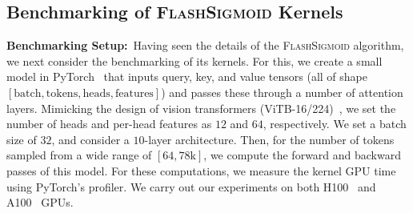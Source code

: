 \subsection{Benchmarking of \textsc{FlashSigmoid} Kernels}
\label{sec:PerformanceAnalysisOfFlashSigmoidKernels}
\noindent\textbf{Benchmarking Setup:}\ Having seen the details of the \textsc{FlashSigmoid} algorithm, we next consider the benchmarking of its kernels.
For this, we create a small model in PyTorch~\citep{DBLP:conf/nips/PaszkeGMLBCKLGA19} that inputs query, key, and value tensors (all of shape $[\textrm{batch}, \textrm{tokens}, \textrm{heads}, \textrm{features}]$) and passes these through a number of attention layers. 
Mimicking the design of vision transformers (ViTB-16/224)~\citep{DBLP:conf/iclr/DosovitskiyB0WZ21}, we set the number of heads and per-head features as $12$ and $64$, respectively.
We set a batch size of $32$, and consider a $10$-layer architecture.
Then, for the number of tokens sampled from a wide range of $[64, 78\mathrm{k}]$, we compute the forward and backward passes of this model.
For these computations, we measure the kernel GPU time using PyTorch's profiler. 
We carry out our experiments on both H100~\citep{DBLP:journals/micro/Choquette23} and A100~\citep{DBLP:journals/micro/ChoquetteGGSK21} GPUs. 
